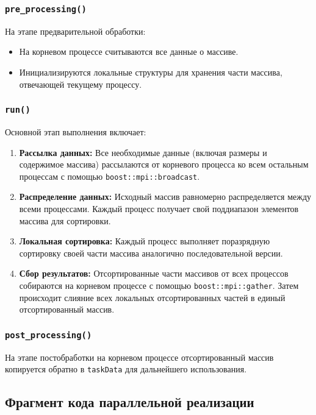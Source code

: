 \documentclass[12pt]{article}
\begin{document}
\subsubsection{\texttt{pre\_processing()}}
На этапе предварительной обработки:
\begin{itemize}
  \item На корневом процессе считываются все данные о массиве.
  \item Инициализируются локальные структуры для хранения части массива, отвечающей текущему процессу.
\end{itemize}

\subsubsection{\texttt{run()}}
Основной этап выполнения включает:
\begin{enumerate}
  \item \textbf{Рассылка данных:} Все необходимые данные (включая размеры и содержимое массива) рассылаются от корневого процесса ко всем остальным процессам с помощью \texttt{boost::mpi::broadcast}.
  
  \item \textbf{Распределение данных:} Исходный массив равномерно распределяется между всеми процессами. Каждый процесс получает свой поддиапазон элементов массива для сортировки.
  
  \item \textbf{Локальная сортировка:} Каждый процесс выполняет поразрядную сортировку своей части массива аналогично последовательной версии.
  
  \item \textbf{Сбор результатов:} Отсортированные части массивов от всех процессов собираются на корневом процессе с помощью \texttt{boost::mpi::gather}. Затем происходит слияние всех локальных отсортированных частей в единый отсортированный массив.
\end{enumerate}

\subsubsection{\texttt{post\_processing()}}
На этапе постобработки на корневом процессе отсортированный массив копируется обратно в \texttt{taskData} для дальнейшего использования.

\subsection{Фрагмент кода параллельной реализации}
\end{document}
